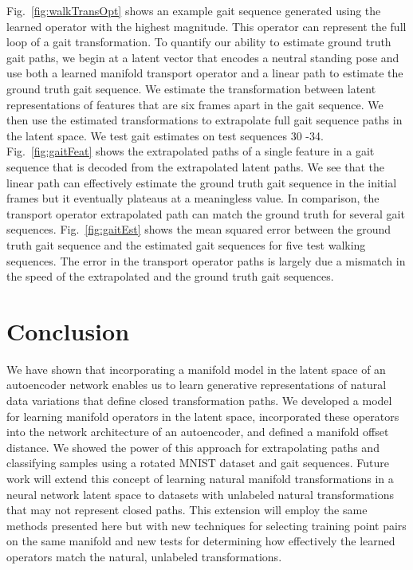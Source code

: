 \documentclass[letterpaper]{article} %
\begin{document}
Fig.~\ref{fig:walkTransOpt} shows an example gait sequence generated using the learned operator with the highest magnitude. This operator can represent the full loop of a gait transformation. To quantify our ability to estimate ground truth gait paths, we begin at a latent vector that encodes a neutral standing pose and use both a learned manifold transport operator and a linear path to estimate the ground truth gait sequence. We estimate the transformation between latent representations of features that are six frames apart in the gait sequence. We then use the estimated transformations to extrapolate full gait sequence paths in the latent space. We test gait estimates on test sequences 30 -34. Fig.~\ref{fig:gaitFeat} shows the extrapolated paths of a single feature in a gait sequence that is decoded from the extrapolated latent paths. We see that the linear path can effectively estimate the ground truth gait sequence in the initial frames but it eventually plateaus at a meaningless value. In comparison, the transport operator extrapolated path can match the ground truth for several gait sequences.  Fig.~\ref{fig:gaitEst} shows the mean squared error between the ground truth gait sequence and the estimated gait sequences for five test walking sequences. The error in the transport operator paths is largely due a mismatch in the speed of the extrapolated and the ground truth gait sequences.



\section{Conclusion}

We have shown that incorporating a manifold model in the latent space of an autoencoder network enables us to learn generative representations of natural data variations that define closed transformation paths. We developed a model for learning manifold operators in the latent space, incorporated these operators into the network architecture of an autoencoder, and defined a manifold offset distance. We showed the power of this approach for extrapolating paths and classifying samples using a rotated MNIST dataset and gait sequences. Future work will extend this concept of learning natural manifold transformations in a neural network latent space to datasets with unlabeled natural transformations that may not represent closed paths. This extension will employ the same methods presented here but with new techniques for selecting training point pairs on the same manifold and new tests for determining how effectively the learned operators match the natural, unlabeled transformations.
\end{document}
